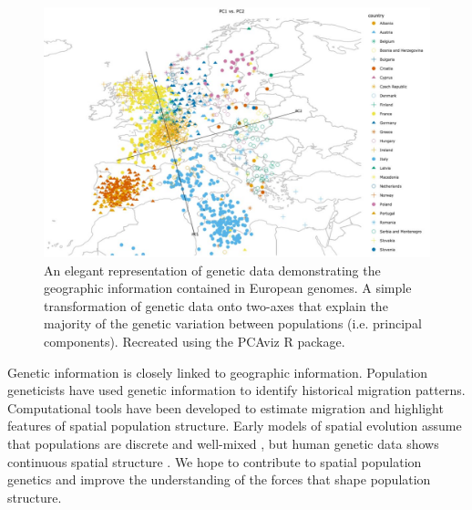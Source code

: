 \begin{figure}[h]
    \centering
    \includegraphics[scale = 0.45]{img/novembre_pca.JPG}
    \caption{An elegant representation of genetic data demonstrating the geographic information contained in European genomes. A simple transformation of genetic data onto two-axes that explain the majority of the genetic variation between populations (i.e. principal components). Recreated using the PCAviz R package. \cite{pcaviz}}
    \label{fig:novembre_pca}
\end{figure}

Genetic information is closely linked to geographic information. Population geneticists have used genetic information to identify historical migration patterns. Computational tools have been developed to estimate migration and highlight features of spatial population structure. \cite{petkova_visualizing_2016} Early models of spatial evolution assume that populations are discrete and well-mixed \cite{sigwart_coalescent_2009} \cite{kingman_coalescent_1982}, but human genetic data shows continuous spatial structure \cite{novembre_interpreting_2008}. We hope to contribute to spatial population genetics and improve the understanding of the forces that shape population structure.


